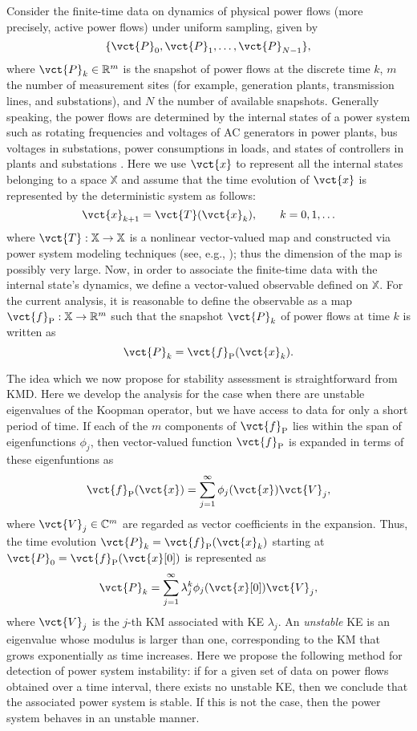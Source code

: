 \documentclass[a4paper,10pt]{article}
\def\bbR{{\mathbb{R}}}
\def\bbX{{\mathbb{X}}}
\def\bbC{{\mathbb{C}}}
\begin{document}
Consider the finite-time data on dynamics of physical power flows (more precisely, active power flows) under uniform sampling, given by
\begin{equation}
\{\vct{P}_0,\vct{P}_1,\ldots,\vct{P}_{N-1}\}, 
\label{eqn:data}
\end{equation}
where $\vct{P}_k\in\bbR^m$ is the snapshot of power flows at the discrete time $k$, $m$ the number of measurement sites (for example, generation plants, transmission lines, and substations), and $N$ the number of available snapshots.  
Generally speaking, the power flows are determined by the internal states of a power system such as rotating frequencies and voltages of AC generators in power plants, bus voltages in substations, power consumptions in loads, and states of controllers in plants and substations \cite{Machowski:1997}.  
Here we use $\vct{x}$ to represent all the internal states belonging to a space $\bbX$ and assume that the time evolution of $\vct{x}$ is represented by the deterministic system as follows:
\[
\vct{x}_{k+1}=\vct{T}(\vct{x}_k),\makebox[2em]{}
k=0,1,\ldots
\]
where $\vct{T}: \bbX\to\bbX$ is a nonlinear vector-valued map and constructed via power system modeling techniques (see, e.g., \cite{Machowski:1997}); thus the dimension of the map is possibly very large.  
Now, in order to associate the finite-time data with the internal state's dynamics, we define a vector-valued observable defined on $\bbX$.  
For the current analysis, it is reasonable to define the observable as a map $\vct{f}_\mathrm{P}: \bbX\to\bbR^m$ such that the snapshot $\vct{P}_k$ of power flows at time $k$ is written as
\[
\vct{P}_k=\vct{f}_\mathrm{P}(\vct{x}_k).
\]

%
The idea which we now propose for stability assessment is straightforward from KMD.  
Here we develop the analysis for the case when there are unstable eigenvalues of the Koopman operator, but we have access to data for only a short period of time.   
If each of the $m$ components of $\vct{f}_\mathrm{P}$ lies within the span of eigenfunctions $\phi_j$, then vector-valued function $\vct{f}_\mathrm{P}$ is expanded in terms of these eigenfuntions as
\[
\vct{f}_\mathrm{P}(\vct{x})=\sum_{j=1}^{\infty}\phi_j(\vct{x})\vct{V}_j, 
\]
where $\vct{V}_j\in\bbC^m$ are regarded as vector coefficients in the expansion.  
Thus, the time evolution $\vct{P}_k=\vct{f}_\mathrm{P}(\vct{x}_k)$ starting at $\vct{P}_0=\vct{f}_\mathrm{P}(\vct{x}[0])$ is represented as
\begin{equation}
\vct{P}_k=\sum^\infty_{j=1}\lambda^k_j\phi_j(\vct{x}[0])\vct{V}_j,
\label{eqn:infinite}
\end{equation}
where $\vct{V}_j$ is the $j$-th KM associated with KE $\lambda_j$.  
An \emph{unstable} KE is an eigenvalue whose modulus is larger than one, corresponding to the KM that grows exponentially as time increases.  
Here we propose the following method for detection of power system instability: if for a given set of data on power flows obtained over a time interval, there exists no unstable KE, then we conclude that the associated power system is stable.  
If this is not the case, then the power system behaves in an unstable manner.  
\end{document}
